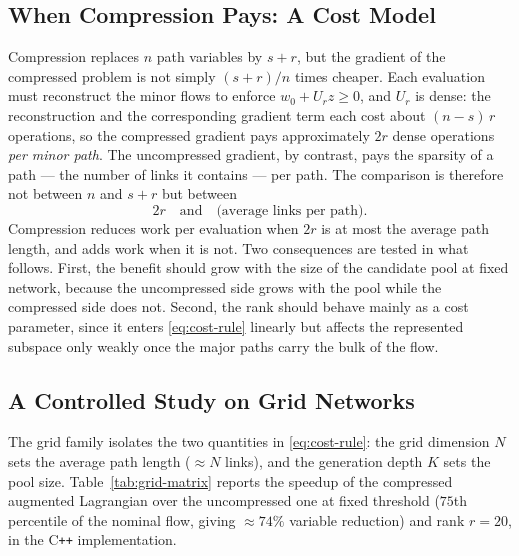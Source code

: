 \documentclass[11pt]{article}
\begin{document}
\subsection{When Compression Pays: A Cost Model}
\label{sec:cost-model}


Compression replaces $n$ path variables by $s+r$, but the gradient of the compressed problem
is not simply $(s+r)/n$ times cheaper. Each evaluation must reconstruct the minor flows to
enforce $w_0+U_rz\ge 0$, and $U_r$ is dense: the reconstruction and the corresponding
gradient term each cost about $(n-s)\,r$ operations, so the compressed gradient pays
approximately $2r$ dense operations \emph{per minor path}. The uncompressed gradient, by
contrast, pays the sparsity of a path --- the number of links it contains --- per path. The
comparison is therefore not between $n$ and $s+r$ but between
\begin{equation}
\label{eq:cost-rule}
2r \quad\text{and}\quad \text{(average links per path)} .
\end{equation}
Compression reduces work per evaluation when $2r$ is at most the average path length, and
adds work when it is not. Two consequences are tested in what follows. First, the benefit
should grow with the size of the candidate pool at fixed network, because the uncompressed
side grows with the pool while the compressed side does not. Second, the rank should behave
mainly as a cost parameter, since it enters \eqref{eq:cost-rule} linearly but affects the
represented subspace only weakly once the major paths carry the bulk of the flow.


\subsection{A Controlled Study on Grid Networks}
\label{sec:grid-study}


The grid family isolates the two quantities in \eqref{eq:cost-rule}: the grid dimension $N$
sets the average path length ($\approx N$ links), and the generation depth $K$ sets the pool
size. Table~\ref{tab:grid-matrix} reports the speedup of the compressed augmented Lagrangian
over the uncompressed one at fixed threshold ($75$th percentile of the nominal flow, giving
$\approx 74\%$ variable reduction) and rank $r=20$, in the C\texttt{++} implementation.
\end{document}
